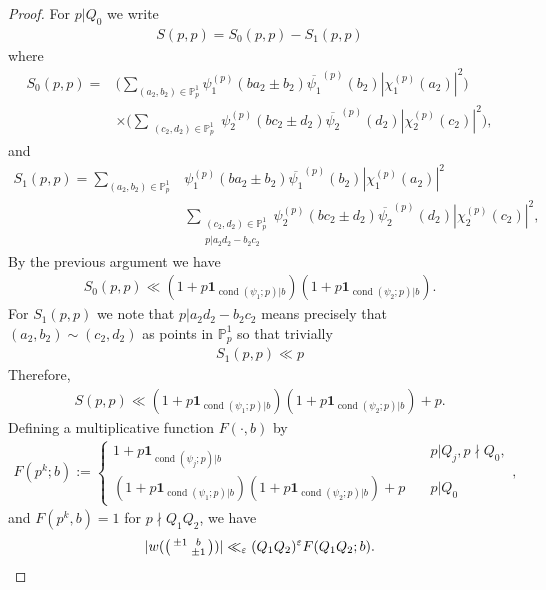 \documentclass[12pt]{amsart}
\theoremstyle{definition}
\theoremstyle{remark}
\numberwithin{equation}{section}
\newcommand{\cond}{\operatorname{cond}}
\newcommand{\1}{{\mathbf 1}}
\newcommand{\eps}{\varepsilon}
\renewcommand{\P}{\mathbb{P}}
\begin{document}
\begin{proof}
For $p| Q_0$ we write
\begin{align*}
    S(p,p) =   S_{0}(p,p) -  S_{1}(p,p)
\end{align*}
where 
\begin{align*}
     S_0(p,p) = &\bigg(\sum_{(a_2,b_2) \in \P^1_{p}}  \psi_1^{(p)} (ba_2\pm b_2)  \overline{\psi_1}^{(p)}  (b_2) |\chi_1^{(p)}  (a_2 )|^2 \bigg)  \\
&\times\bigg(\sum_{\substack{(c_2,d_2) \in \P^1 _{p } }} \psi_2^{(p)}  (b c_2 \pm d_2) \overline{  \psi_2}^{(p)}  (d_2) |\chi_2^{(p)}  (c_2)|^2 \bigg),  
\end{align*}
and
\begin{align*}
     S_1(p,p) = \sum_{(a_2,b_2) \in \P^1_{p}} & \psi_1^{(p)} (ba_2\pm b_2)  \overline{\psi_1}^{(p)}  (b_2) |\chi_1^{(p)}  (a_2 )|^2   \\
&\sum_{\substack{(c_2,d_2) \in \P^1 _{p}  \\ p| a_2 d_2-b_2 c_2} } \psi_2^{(p)}  (b c_2 \pm d_2) \overline{  \psi_2}^{(p)}  (d_2) |\chi_2^{(p)}  (c_2)|^2,  
\end{align*}
By the previous argument we have
\begin{align*}
    S_0(p,p) \ll   ( 1+ p  \mathbf{1}_{\cond(\psi_1;p) |b} )( 1+ p  \mathbf{1}_{\cond(\psi_2;p) |b} ).
\end{align*}
For $S_1(p,p)$ we note that $p|a_2 d_2-b_2c_2$ means precisely that $(a_2,b_2) \sim (c_2,d_2)$ as points in $\P^1_p$ so that trivially
\begin{align*}
     S_1(p,p)  \ll p
\end{align*}
Therefore,
\begin{align*}
      S(p,p) \ll ( 1+ p  \mathbf{1}_{\cond(\psi_1;p) |b} )( 1+ p  \mathbf{1}_{\cond(\psi_2;p) |b} ) + p.
\end{align*}
Defining a multiplicative function $F(\cdot,b)$ by 
\begin{align*}
    F(p^k; b) := \begin{cases}
    1+p\mathbf{1}_{\cond(\psi_j;p) |b}  \quad & p | Q_j, p \nmid Q_0, \\
    ( 1+ p  \mathbf{1}_{\cond(\psi_1;p) |b} )( 1+ p  \mathbf{1}_{\cond(\psi_2;p) |b} ) + p   \quad &p | Q_0 \end{cases},
\end{align*}
and $F(p^k,b)=1$ for $p \nmid Q_1Q_2$, we have
\begin{align*}
  | w(\smqty(\pm 1 & b \\  & \pm 1))| \ll_\eps (Q_1Q_2)^{\eps}  F(Q_1 Q_2; b).
\end{align*}

\end{proof}
\end{document}
